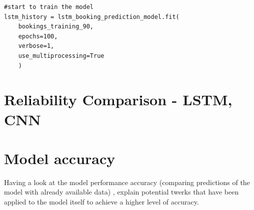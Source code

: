 \begin{lstlisting}
#start to train the model
lstm_history = lstm_booking_prediction_model.fit(
    bookings_training_90,
    epochs=100,
    verbose=1,
    use_multiprocessing=True
	)
\end{lstlisting}





\section{Reliability Comparison - LSTM, CNN}

\section{Model accuracy}
Having a look at the model performance accuracy (comparing predictions of the model with already available data) , explain potential twerks that have been applied to the model itself to achieve a higher level of accuracy.

